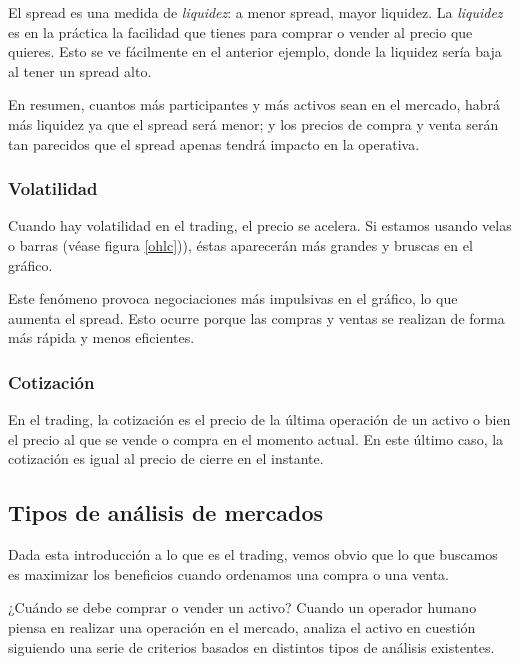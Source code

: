 El spread es una medida de \textit{liquidez}: a menor spread, mayor liquidez. La \textit{liquidez} es en la práctica la facilidad que tienes para comprar o vender al precio que quieres. Esto se ve fácilmente en el anterior ejemplo, donde la liquidez sería baja al tener un spread alto. \newline

En resumen, cuantos más participantes y más activos sean en el mercado, habrá más liquidez ya que el spread será menor; y los precios de compra y venta serán tan parecidos que el spread apenas tendrá impacto en la operativa.

\subsubsection{Volatilidad}

Cuando hay volatilidad en el trading, el precio se acelera. Si estamos usando velas o barras (véase figura \ref{ohlc})), éstas aparecerán más grandes y bruscas en el gráfico.\newline
	
Este fenómeno provoca negociaciones más impulsivas en el gráfico, lo que aumenta el spread. Esto ocurre porque las compras y ventas se realizan de forma más rápida y menos eficientes. \newline

\subsubsection{Cotización}

En el trading, la cotización es el precio de la última operación de un activo o bien el precio al que se vende o compra en el momento actual. En este último caso, la cotización es igual al precio de cierre en el instante. \newline

\subsection{Tipos de análisis de mercados}

Dada esta introducción a lo que es el trading, vemos obvio que lo que buscamos es maximizar los beneficios cuando ordenamos una compra o una venta. \newline

¿Cuándo se debe comprar o vender un activo? Cuando un operador humano piensa en realizar una operación en el mercado, analiza el activo en cuestión siguiendo una serie de criterios basados en distintos tipos de análisis existentes. \newline

